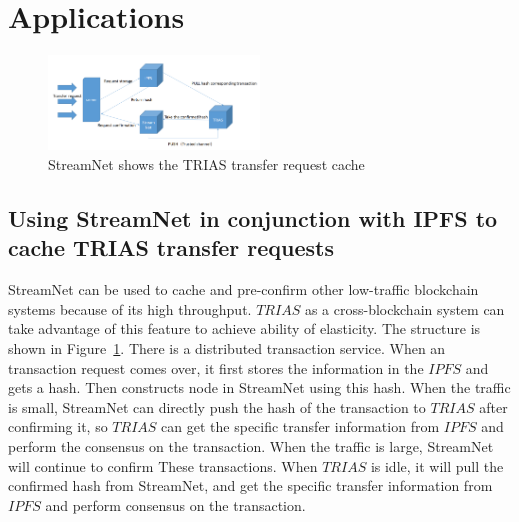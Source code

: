 \section{Applications}

\begin{figure}[!ht]
\begin{center}
        \includegraphics[width=0.50\textwidth]{figures/trias.png}
        \caption{StreamNet shows the TRIAS transfer request cache}
        \label{trias}
\end{center}
\end{figure}

\subsection{Using StreamNet in conjunction with IPFS to cache TRIAS transfer requests}
StreamNet can be used to cache and pre-confirm other low-traffic blockchain systems because of its high throughput. 
$TRIAS$ as a cross-blockchain system can take advantage of this feature to achieve ability of elasticity.
The structure is shown in Figure~\ref{trias}. 
There is a distributed transaction service. 
When an transaction request comes over, it first stores the information in the $IPFS$ and gets a hash.
Then constructs node in StreamNet using this hash.
When the traffic is small, StreamNet can directly push the hash of the transaction to $TRIAS$ after confirming it, 
so $TRIAS$ can get the specific transfer information from $IPFS$ and perform the consensus on the transaction. 
When the traffic is large, StreamNet will continue to confirm These transactions. 
When $TRIAS$ is idle, it will pull the confirmed hash from StreamNet, 
and get the specific transfer information from $IPFS$ and perform consensus on the transaction.
